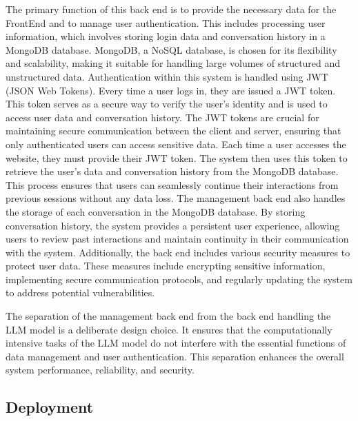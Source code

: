 The primary function of this back end is to provide the necessary data for the FrontEnd and to manage user authentication. This includes processing user information, which involves storing login data and conversation history in a MongoDB database. MongoDB, a NoSQL database, is chosen for its flexibility and scalability, making it suitable for handling large volumes of structured and unstructured data. Authentication within this system is handled using JWT (JSON Web Tokens). Every time a user logs in, they are issued a JWT token. This token serves as a secure way to verify the user's identity and is used to access user data and conversation history. The JWT tokens are crucial for maintaining secure communication between the client and server, ensuring that only authenticated users can access sensitive data. Each time a user accesses the website, they must provide their JWT token. The system then uses this token to retrieve the user's data and conversation history from the MongoDB database. This process ensures that users can seamlessly continue their interactions from previous sessions without any data loss. The management back end also handles the storage of each conversation in the MongoDB database. By storing conversation history, the system provides a persistent user experience, allowing users to review past interactions and maintain continuity in their communication with the system. Additionally, the back end includes various security measures to protect user data. These measures include encrypting sensitive information, implementing secure communication protocols, and regularly updating the system to address potential vulnerabilities.

The separation of the management back end from the back end handling the LLM model is a deliberate design choice. It ensures that the computationally intensive tasks of the LLM model do not interfere with the essential functions of data management and user authentication. This separation enhances the overall system performance, reliability, and security.

\subsection{Deployment}
\label{subsec:deployment}

